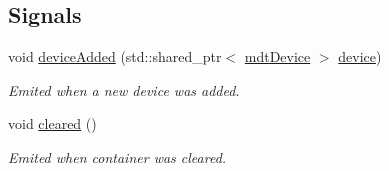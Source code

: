 \subsection*{Signals}
\begin{DoxyCompactItemize}
\item 
void \hyperlink{classmdt_device_container_a41a5239ce685162e9d498aca3dce87cb}{device\-Added} (std\-::shared\-\_\-ptr$<$ \hyperlink{classmdt_device}{mdt\-Device} $>$ \hyperlink{classmdt_device_container_a6361dffbdc3d47f0cce86f78b5f202eb}{device})
\begin{DoxyCompactList}\small\item\em Emited when a new device was added. \end{DoxyCompactList}\item 
void \hyperlink{classmdt_device_container_a2e388a772abad3d9518f2ebebe1199fd}{cleared} ()
\begin{DoxyCompactList}\small\item\em Emited when container was cleared. \end{DoxyCompactList}\end{DoxyCompactItemize}

